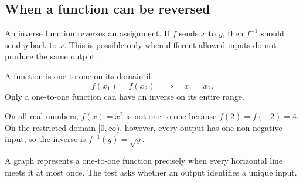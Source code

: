 \subsection{When a function can be reversed}

An inverse function reverses an assignment. If \(f\) sends \(x\) to \(y\), then \(f^{-1}\) should send \(y\) back to \(x\). This is possible only when different allowed inputs do not produce the same output.

\begin{definitionbox}
A function is one-to-one on its domain if
\[
f(x_1)=f(x_2)
\quad\Longrightarrow\quad
x_1=x_2.
\]
Only a one-to-one function can have an inverse on its entire range.
\end{definitionbox}

\begin{examplebox}
On all real numbers, \(f(x)=x^2\) is not one-to-one because \(f(2)=f(-2)=4\). On the restricted domain \([0,\infty)\), however, every output has one non-negative input, so the inverse is \(f^{-1}(y)=\sqrt y\).
\end{examplebox}

\begin{interpretationbox}
A graph represents a one-to-one function precisely when every horizontal line meets it at most once. The test asks whether an output identifies a unique input.
\end{interpretationbox}

